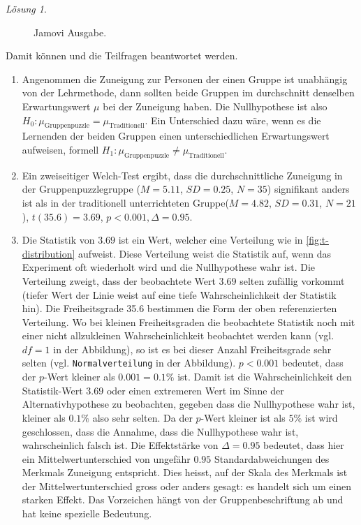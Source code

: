 \documentclass[
]{book}
\providecommand{\tightlist}{%
  \setlength{\itemsep}{0pt}\setlength{\parskip}{0pt}}
\theoremstyle{definition}
\theoremstyle{definition}
\theoremstyle{definition}
\theoremstyle{definition}
\theoremstyle{remark}
\newtheorem*{solution}{Lösung}
\begin{document}
\begin{solution}
\begin{figure}
{}

\caption{Jamovi Ausgabe.}\label{fig:sol-gruppenpuzzle-output}
\end{figure}

Damit können und die Teilfragen beantwortet werden.

\begin{enumerate}
\def\labelenumi{\alph{enumi})}
\tightlist
\item
  Angenommen die Zuneigung zur Personen der einen Gruppe ist unabhängig von der Lehrmethode, dann sollten beide Gruppen im durchschnitt denselben Erwartungswert \(\mu\) bei der Zuneigung haben. Die Nullhypothese ist also \(H_0: \mu_\text{Gruppenpuzzle} = \mu_\text{Traditionell}\). Ein Unterschied dazu wäre, wenn es die Lernenden der beiden Gruppen einen unterschiedlichen Erwartungswert aufweisen, formell \(H_1: \mu_\text{Gruppenpuzzle} \neq \mu_\text{Traditionell}\).
\item
  Ein zweiseitiger Welch-Test ergibt, dass die durchschnittliche Zuneigung in der Gruppenpuzzlegruppe (\(M = 5.11\), \(SD = 0.25\), \(N = 35\)) signifikant anders ist als in der traditionell unterrichteten Gruppe(\(M = 4.82\), \(SD = 0.31\), \(N = 21\)), \(t(35.6) = 3.69\), \(p < 0.001, \Delta = 0.95\).
\item
  Die Statistik von \(3.69\) ist ein Wert, welcher eine Verteilung wie in \ref{fig:t-distribution} aufweist. Diese Verteilung weist die Statistik auf, wenn das Experiment oft wiederholt wird und die Nullhypothese wahr ist. Die Verteilung zweigt, dass der beobachtete Wert \(3.69\) selten zufällig vorkommt (tiefer Wert der Linie weist auf eine tiefe Wahrscheinlichkeit der Statistik hin). Die Freiheitsgrade 35.6 bestimmen die Form der oben referenzierten Verteilung. Wo bei kleinen Freiheitsgraden die beobachtete Statistik noch mit einer nicht allzukleinen Wahrscheinlichkeit beobachtet werden kann (vgl. \(df = 1\) in der Abbildung), so ist es bei dieser Anzahl Freiheitsgrade sehr selten (vgl. \texttt{Normalverteilung} in der Abbildung). \(p < 0.001\) bedeutet, dass der \(p\)-Wert kleiner als \(0.001 = 0.1\%\) ist. Damit ist die Wahrscheinlichkeit den Statistik-Wert \(3.69\) oder einen extremeren Wert im Sinne der Alternativhypothese zu beobachten, gegeben dass die Nullhypothese wahr ist, kleiner als \(0.1\%\) also sehr selten. Da der \(p\)-Wert kleiner ist als \(5\%\) ist wird geschlossen, dass die Annahme, dass die Nullhypothese wahr ist, wahrscheinlich falsch ist. Die Effektstärke von \(\Delta = 0.95\) bedeutet, dass hier ein Mittelwertunterschied von ungefähr \(0.95\) Standardabweichungen des Merkmals Zuneigung entspricht. Dies heisst, auf der Skala des Merkmals ist der Mittelwertunterschied gross oder anders gesagt: es handelt sich um einen starken Effekt. Das Vorzeichen hängt von der Gruppenbeschriftung ab und hat keine spezielle Bedeutung.
\end{enumerate}

\end{solution}
\end{document}
